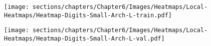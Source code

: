 \begin{figure}[h]
    \centering
    \texttt{[image: sections/chapters/Chapter6/Images/Heatmaps/Local-Heatmaps/Heatmap-Digits-Small-Arch-L-train.pdf]}
    \caption{}
    \label{fig:heatmap-Small-train}
\end{figure}

\begin{figure}[h]
    \centering
    \texttt{[image: sections/chapters/Chapter6/Images/Heatmaps/Local-Heatmaps/Heatmap-Digits-Small-Arch-L-val.pdf]}
    \caption{}
    \label{fig:heatmap-Small-val}
\end{figure}
